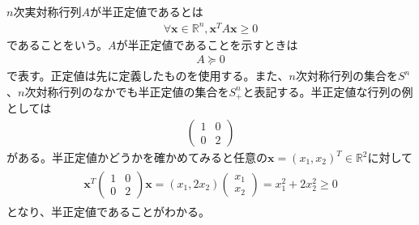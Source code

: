 $n$次実対称行列$A$が半正定値であるとは
\begin{align} \label{PSD}
  \forall \mathbf{x} \in \mathbb{R}^n, \mathbf{x}^T A \mathbf{x} \geq 0
\end{align}
であることをいう。$A$が半正定値であることを示すときは
\begin{align*}
  A \succeq 0
\end{align*}
で表す。正定値は先に定義したものを使用する。また、$n$次対称行列の集合を$S^n$、$n$次対称行列のなかでも半正定値の集合を$S_+^n$と表記する。半正定値な行列の例としては
\begin{align*}
  \left(
    \begin{array}{cc}
      1 & 0 \\
      0 & 2
    \end{array}
  \right)
\end{align*}
がある。半正定値かどうかを確かめてみると任意の$\mathbf{x} = \left(x_1, x_2\right)^T \in \mathbb{R}^2$に対して
\begin{align*}
  \begin{array}{cc}
         \mathbf{x}^T
           \left(
             \begin{array}{cc}
               1 & 0 \\
               0 & 2
             \end{array}
           \right)
         \mathbf{x}
    =    \left(x_1, 2x_2\right)
           \left(
             \begin{array}{c}
               x_1 \\
               x_2
             \end{array}
           \right)
    =    x_1^2 + 2 x_2^2
    \geq 0
  \end{array}
\end{align*}
となり、半正定値であることがわかる。

